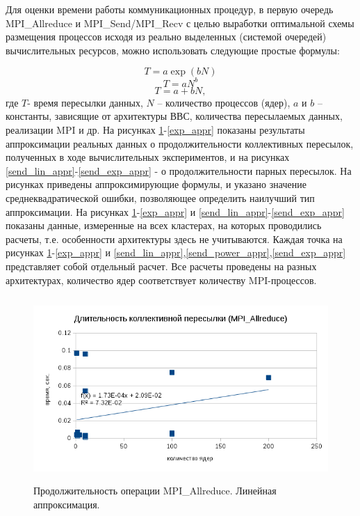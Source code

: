         Для оценки времени работы коммуникационных процедур, в первую очередь MPI\_Allreduce и MPI\_Send/MPI\_Recv с целью выработки оптимальной схемы размещения процессов исходя из реально выделенных (системой очередей) вычислительных ресурсов, можно использовать следующие простые формулы:
        
$$
T = a \exp (b N)
$$
$$
T = a N^b
$$
$$
T = a +bN,
$$
        где $T$- время пересылки данных, $N$ – количество процессов (ядер), $a$ и $b$ – константы, зависящие от архитектуры ВВС, количества пересылаемых данных, реализации MPI и др. На рисунках \ref{lin_appr}-\ref{exp_appr} показаны результаты аппроксимации реальных данных о продолжительности коллективных пересылок, полученных в ходе вычислительных экспериментов, и на рисунках \ref{send_lin_appr}-\ref{send_exp_appr} - о продолжительности парных пересылок. На рисунках приведены аппроксимирующие формулы, и указано значение среднеквадратической ошибки, позволяющее определить наилучший тип аппроксимации. На рисунках \ref{lin_appr}-\ref{exp_appr} и \ref{send_lin_appr}-\ref{send_exp_appr} показаны данные, измеренные на всех кластерах, на которых проводились расчеты, т.е. особенности архитектуры здесь не учитываются.
        Каждая точка на рисунках \ref{lin_appr}-\ref{exp_appr} и \ref{send_lin_appr},\ref{send_power_appr},\ref{send_exp_appr} представляет собой отдельный расчет. Все расчеты проведены на разных архитектурах, количество ядер соответствует количеству MPI-процессов.
        
        \begin{figure}[htb]
        	\begin{center}
        		\includegraphics[height=7cm,keepaspectratio]{images/RomanenkoAASnytnikovAVChernykhIGadaptationtosupercomputerfinalEXTENDEDREFERENCES-img2.png}
        	\end{center}
        	\caption{Продолжительность операции MPI\_Allreduce. Линейная аппроксимация.}
        	\label{lin_appr}
        \end{figure}
        
